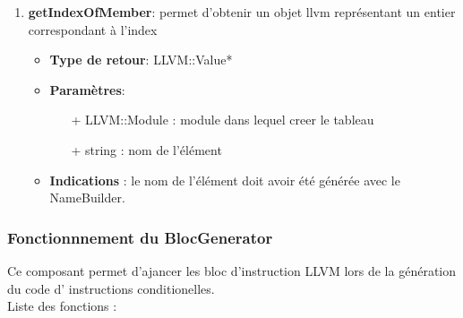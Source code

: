 \documentclass{article}
\begin{document}
\begin{enumerate}
  \item \textbf{getIndexOfMember}: permet d'obtenir un objet llvm représentant un entier correspondant à l'index
    \begin{itemize}
    \item \textbf{Type de retour}: LLVM::Value*
    \item \textbf{Paramètres}:
    \begin{enumerate}
      \item[+] LLVM::Module : module dans lequel creer le tableau
      \item[+] string : nom de l'élément
    \end{enumerate}
    \item \textbf{Indications} : le nom de l'élément doit avoir été générée avec le NameBuilder.
  \end{itemize}

  \end{enumerate}

   \subsubsection{Fonctionnnement du BlocGenerator}

   Ce composant permet d'ajancer les bloc d'instruction LLVM lors de la génération du code d' instructions conditionelles.
   \\Liste des fonctions :\
  
\end{document}
